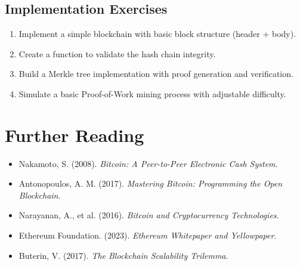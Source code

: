 \documentclass[11pt,a4paper]{article}
\begin{document}
\subsection{Implementation Exercises}

\begin{enumerate}
  \item Implement a simple blockchain with basic block structure (header + body).
  \item Create a function to validate the hash chain integrity.
  \item Build a Merkle tree implementation with proof generation and verification.
  \item Simulate a basic Proof-of-Work mining process with adjustable difficulty.
\end{enumerate}

\section{Further Reading}

\begin{itemize}
  \item Nakamoto, S. (2008). \textit{Bitcoin: A Peer-to-Peer Electronic Cash System}.
  \item Antonopoulos, A. M. (2017). \textit{Mastering Bitcoin: Programming the Open Blockchain}.
  \item Narayanan, A., et al. (2016). \textit{Bitcoin and Cryptocurrency Technologies}.
  \item Ethereum Foundation. (2023). \textit{Ethereum Whitepaper and Yellowpaper}.
  \item Buterin, V. (2017). \textit{The Blockchain Scalability Trilemma}.
\end{itemize}
\end{document}
